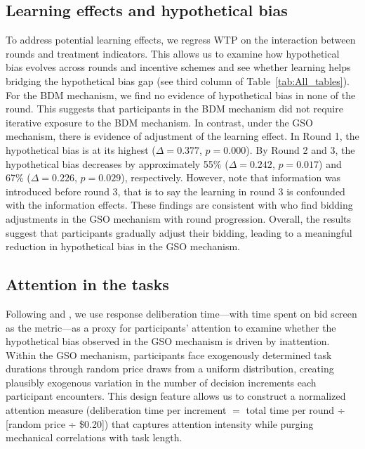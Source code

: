 \documentclass[12pt]{article}
\begin{document}
\subsection{Learning effects and hypothetical bias}
\label{Sec: learning}
To address potential learning effects, we regress WTP on the interaction between rounds and treatment indicators. This allows us to examine how hypothetical bias evolves across rounds and incentive schemes and see whether learning helps bridging the hypothetical bias gap (see third column of Table~\ref{tab:All_tables}). For the BDM mechanism, we find no evidence of hypothetical bias in none of the round. This suggests that participants in the BDM mechanism did not require iterative exposure to the BDM mechanism. 
In contrast, under the GSO mechanism, there is evidence of adjustment of the learning effect. In Round 1, the hypothetical bias is at its highest (\(\Delta = 0.377\), \(p = 0.000\)). By Round 2 and 3, the hypothetical bias decreases by approximately 55\% (\(\Delta = 0.242\), \(p =0.017\)) and 67\% (\(\Delta = 0.226\), \(p =0.029\)), respectively. However, note that information was introduced before round 3, that is to say the learning in round 3 is confounded with the information effects. These findings are consistent with \citet{brown_is_2023} who find bidding adjustments in the GSO mechanism with round progression. 
Overall, the results suggest that participants gradually adjust their bidding, leading to a meaningful reduction in hypothetical bias in the GSO mechanism. 






\subsection{Attention in the tasks}
\label{Sec: Attention}

Following \citet{alos2021cognitive} and \citet{alaoui2016endogenous}, we use response deliberation time---with time spent on bid screen as the metric---as a proxy for participants’ attention to examine whether the hypothetical bias observed in the GSO mechanism is driven by inattention.
Within the GSO mechanism, participants face exogenously determined task durations through random price draws from a uniform distribution, creating plausibly exogenous variation in the number of decision increments each participant encounters. This design feature allows us to construct a normalized attention measure (deliberation time per increment $=$ total time per round ÷ [random price ÷ \$0.20]) that captures attention intensity while purging mechanical correlations with task length. 
\end{document}
